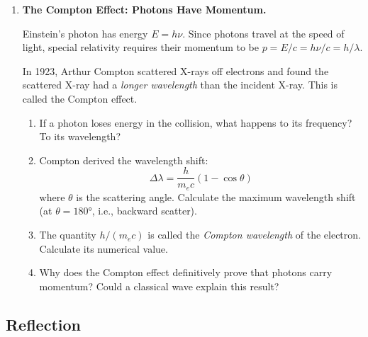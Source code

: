 \documentclass[12pt, a4paper]{book}
\newcommand{\newterm}[1]{\textit{\textcolor{DiscoveryColor}{#1}}}
\begin{document}
\begin{deepbox}
\begin{enumerate}[label=\textbf{D\arabic*.}]
  \item \textbf{The Compton Effect: Photons Have Momentum.}

        Einstein's photon has energy $E = h\nu$.
        Since photons travel at the speed of light, special
        relativity requires their momentum to be $p = E/c = h\nu/c = h/\lambda$.

        In 1923, Arthur Compton scattered X-rays off electrons
        and found the scattered X-ray had a \emph{longer
        wavelength} than the incident X-ray.
        This is called the Compton effect.

        \begin{enumerate}[label=(\alph*)]
          \item If a photon loses energy in the collision,
                what happens to its frequency?
                To its wavelength?
          \item Compton derived the wavelength shift:
                \[
                  \Delta\lambda = \frac{h}{m_e c}(1-\cos\theta)
                \]
                where $\theta$ is the scattering angle.
                Calculate the maximum wavelength shift
                (at $\theta = 180°$, i.e., backward scatter).
          \item The quantity $h/(m_e c)$ is called the
                \newterm{Compton wavelength} of the electron.
                Calculate its numerical value.
          \item Why does the Compton effect definitively prove
                that photons carry momentum?
                Could a classical wave explain this result?
        \end{enumerate}

\end{enumerate}
\end{deepbox}

\subsection*{Reflection}
\end{document}
